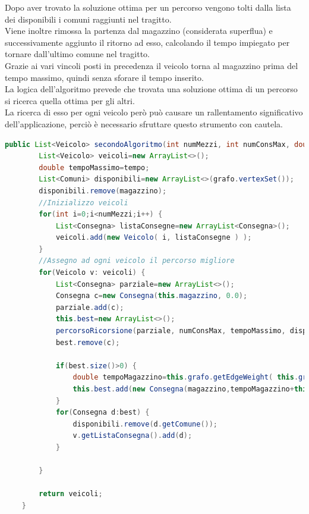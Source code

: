 \documentclass[a4paper,12pt]{report}
\begin{document}
Dopo aver trovato la soluzione ottima per un percorso vengono tolti dalla lista dei disponibili i comuni raggiunti nel tragitto.\\
Viene inoltre rimossa la partenza dal magazzino (considerata superflua) e successivamente
aggiunto il ritorno ad esso, calcolando il tempo impiegato per tornare dall'ultimo comune nel tragitto.\\
Grazie ai vari vincoli posti in precedenza il veicolo torna al magazzino prima del tempo massimo, quindi
senza sforare il tempo inserito.\\
La logica dell'algoritmo prevede che trovata una soluzione ottima di un percorso
si ricerca quella ottima per gli altri.\\
La ricerca di esso per ogni veicolo però può causare un rallentamento significativo
dell'applicazione, perciò è necessario sfruttare questo strumento con cautela.

\begin{center}
\begin{lstlisting}[caption={Metodo secondoAlgoritmo() della classe Model},  label={lst:secondoAlgoritmo},captionpos=b, language=Java]
	public List<Veicolo> secondoAlgoritmo(int numMezzi, int numConsMax, double tempo) {
		List<Veicolo> veicoli=new ArrayList<>();
		double tempoMassimo=tempo;
		List<Comuni> disponibili=new ArrayList<>(grafo.vertexSet());
		disponibili.remove(magazzino);
		//Inizializzo veicoli
		for(int i=0;i<numMezzi;i++) {
			List<Consegna> listaConsegne=new ArrayList<Consegna>();
			veicoli.add(new Veicolo( i, listaConsegne ) );
		}
		//Assegno ad ogni veicolo il percorso migliore
		for(Veicolo v: veicoli) {
			List<Consegna> parziale=new ArrayList<>();
			Consegna c=new Consegna(this.magazzino, 0.0);
			parziale.add(c);
			this.best=new ArrayList<>();
			percorsoRicorsione(parziale, numConsMax, tempoMassimo, disponibili, 0.0);
			best.remove(c);
			
			if(best.size()>0) {
				double tempoMagazzino=this.grafo.getEdgeWeight( this.grafo.getEdge( best.get( best.size()-1 ).getComune(),this.magazzino)  );
				this.best.add(new Consegna(magazzino,tempoMagazzino+this.best.get(best.size()-1).getTime()));
			}
			for(Consegna d:best) {
				disponibili.remove(d.getComune());
				v.getListaConsegna().add(d);
			}
			
		}
		
		return veicoli;
	}
\end{lstlisting}
\end{center}
\end{document}

